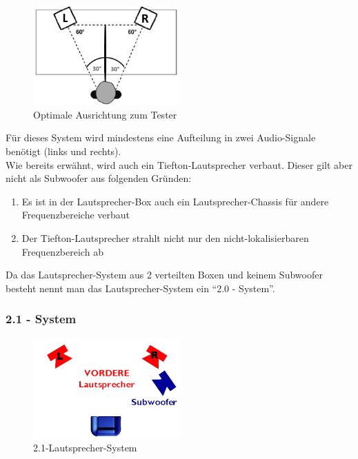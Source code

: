 \begin{figure} [H]
	\centering
	\includegraphics[width=0.5\textwidth]{img/Grundlagen/Mehrweg-Lautsprechersysteme/opt-20-aufstellung.jpg}
	\caption{Optimale Ausrichtung zum Tester}
	\label{fig:3.2.4}
\end{figure}

Für dieses System wird mindestens eine Aufteilung in zwei Audio-Signale benötigt (links und rechts).\\
Wie bereits erwähnt, wird auch ein Tiefton-Lautsprecher verbaut.
Dieser gilt aber nicht als Subwoofer aus folgenden Gründen:
\begin{enumerate}
	\item Es ist in der Lautsprecher-Box auch ein Lautsprecher-Chassis für andere Frequenzbereiche verbaut
	\item Der Tiefton-Lautsprecher strahlt nicht nur den nicht-lokalisierbaren Frequenzbereich ab
\end{enumerate}
Da das Lautsprecher-System aus 2 verteilten Boxen und keinem Subwoofer besteht nennt man das Lautsprecher-System ein \enquote{2.0 - System}.


\newpage
\subsubsection*{2.1 - System}
\begin{figure} [H]
	\centering
	\includegraphics[width=0.5\textwidth]{img/Grundlagen/Mehrweg-Lautsprechersysteme/DOLBYDigital21-cut.jpg}
	\caption{2.1-Lautsprecher-System}
	\label{fig:3.2.5}
\end{figure}


